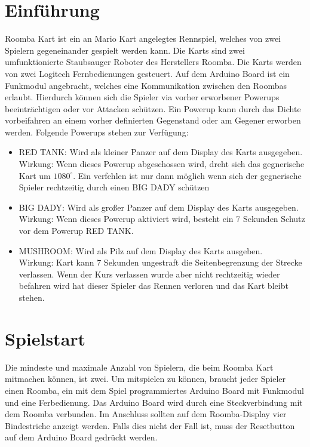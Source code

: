 \section{Einführung}
Roomba Kart ist ein an Mario Kart angelegtes Rennspiel, welches von zwei Spielern gegeneinander gespielt werden kann. Die Karts sind zwei umfunktionierte Staubsauger Roboter des Herstellers Roomba. Die Karts werden von zwei Logitech Fernbedienungen gesteuert. Auf dem Arduino Board ist ein Funkmodul angebracht, welches eine Kommunikation zwischen den Roombas erlaubt. Hierdurch können sich die Spieler via vorher erworbener Powerups beeinträchtigen oder vor Attacken schützen.  Ein Powerup kann durch das Dichte vorbeifahren an einem vorher definierten Gegenstand oder am Gegener erworben werden. Folgende Powerups stehen zur Verfügung: 

\begin{itemize}
\item RED TANK: Wird als kleiner Panzer auf dem Display des Karts ausgegeben.\\Wirkung: Wenn dieses Powerup abgeschossen wird, dreht sich das gegnerische Kart um $1080^\circ$. Ein verfehlen ist nur dann möglich 	wenn sich der gegnerische Spieler rechtzeitig durch einen BIG DADY schützen 
\item BIG DADY: Wird als großer Panzer auf dem Display des Karts ausgegeben.
\\Wirkung: Wenn dieses Powerup aktiviert wird, besteht ein 7 Sekunden Schutz vor  
dem Powerup RED TANK. 
\item MUSHROOM: Wird als Pilz auf dem Display des Karts ausgeben. 
\\Wirkung: Kart kann 7 Sekunden ungestraft die Seitenbegrenzung der Strecke verlassen. 		
Wenn der Kurs verlassen wurde aber nicht rechtzeitig wieder befahren wird hat dieser 	
Spieler das Rennen verloren und das Kart bleibt stehen.
\end{itemize}

\section{Spielstart}
Die mindeste und maximale Anzahl von Spielern, die beim Roomba Kart mitmachen können, ist zwei. Um mitspielen zu können, braucht jeder Spieler einen Roomba, ein mit dem Spiel programmiertes Arduino Board mit Funkmodul und eine Ferbedienung. Das Arduino Board wird durch eine Steckverbindung mit dem Roomba verbunden. Im Anschluss sollten auf dem Roomba-Display vier Bindestriche anzeigt werden. Falls dies nicht der Fall ist, muss der Resetbutton auf dem Arduino Board gedrückt werden.

